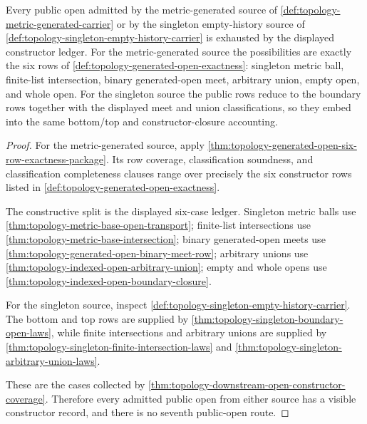 \begin{theorem}
\label{thm:topology-obligation-open-constructor-exhaustion}
Every public open admitted by the metric-generated source of \autoref{def:topology-metric-generated-carrier} or by the singleton empty-history source of \autoref{def:topology-singleton-empty-history-carrier} is exhausted by the displayed constructor ledger. For the metric-generated source the possibilities are exactly the six rows of \autoref{def:topology-generated-open-exactness}: singleton metric ball, finite-list intersection, binary generated-open meet, arbitrary union, empty open, and whole open. For the singleton source the public rows reduce to the boundary rows together with the displayed meet and union classifications, so they embed into the same bottom/top and constructor-closure accounting.
\end{theorem}
\begin{proof}
For the metric-generated source, apply \autoref{thm:topology-generated-open-six-row-exactness-package}. Its row coverage, classification soundness, and classification completeness clauses range over precisely the six constructor rows listed in \autoref{def:topology-generated-open-exactness}.

The constructive split is the displayed six-case ledger. Singleton metric balls use \autoref{thm:topology-metric-base-open-transport}; finite-list intersections use \autoref{thm:topology-metric-base-intersection}; binary generated-open meets use \autoref{thm:topology-generated-open-binary-meet-row}; arbitrary unions use \autoref{thm:topology-indexed-open-arbitrary-union}; empty and whole opens use \autoref{thm:topology-indexed-open-boundary-closure}.

For the singleton source, inspect \autoref{def:topology-singleton-empty-history-carrier}. The bottom and top rows are supplied by \autoref{thm:topology-singleton-boundary-open-laws}, while finite intersections and arbitrary unions are supplied by \autoref{thm:topology-singleton-finite-intersection-laws} and \autoref{thm:topology-singleton-arbitrary-union-laws}.

These are the cases collected by \autoref{thm:topology-downstream-open-constructor-coverage}. Therefore every admitted public open from either source has a visible constructor record, and there is no seventh public-open route.
\end{proof}

